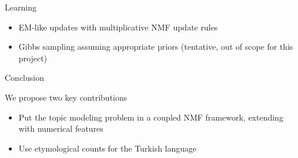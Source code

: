 \documentclass[pdf]{beamer}
\begin{document}
\begin{frame}{Learning}
	
	\begin{itemize}
		\item EM-like updates with multiplicative NMF update rules 
		\item Gibbs sampling assuming appropriate priors (tentative, out of scope for this project)
	\end{itemize}
	
\end{frame}

\begin{frame}{Conclusion}
	
	We propose two key contributions
	\begin{itemize}
		\item Put the topic modeling problem in a coupled NMF framework, extending with numerical features
		\item Use etymological counts for the Turkish language
	\end{itemize}
	
\end{frame}

{}

\end{document}
